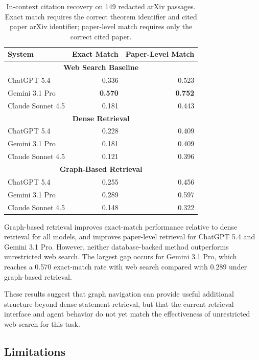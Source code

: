 \begin{table}[h]
\centering
\setlength{\tabcolsep}{4pt}
\small
\begin{tabular}{lrr}
\toprule
\textbf{System} & \textbf{Exact Match} & \textbf{Paper-Level Match} \\
\midrule
\multicolumn{3}{c}{\textbf{Web Search Baseline}} \\
ChatGPT 5.4       & 0.336 & 0.523 \\
Gemini 3.1 Pro    & \textbf{0.570} & \textbf{0.752} \\
Claude Sonnet 4.5 & 0.181 & 0.443 \\
\midrule
\multicolumn{3}{c}{\textbf{Dense Retrieval}} \\
ChatGPT 5.4       & 0.228 & 0.409 \\
Gemini 3.1 Pro    & 0.181 & 0.409 \\
Claude Sonnet 4.5 & 0.121 & 0.396 \\
\midrule
\multicolumn{3}{c}{\textbf{Graph-Based Retrieval}} \\
ChatGPT 5.4       & 0.255 & 0.456 \\
Gemini 3.1 Pro    & 0.289 & 0.597 \\
Claude Sonnet 4.5 & 0.148 & 0.322 \\
\bottomrule
\end{tabular}
\caption{
In-context citation recovery on 149 redacted arXiv passages. Exact match
requires the correct theorem identifier and cited paper arXiv identifier;
paper-level match requires only the correct cited paper.
}
\label{tab:literature-search}
\end{table}

Graph-based retrieval improves exact-match performance relative to dense
retrieval for all models, and improves paper-level
retrieval for ChatGPT 5.4 and Gemini 3.1 Pro. However, neither database-backed method outperforms unrestricted web search. The largest gap occurs for Gemini 3.1 Pro, which reaches a 0.570 exact-match rate with web search compared with 0.289 under graph-based retrieval.

These results suggest that graph navigation can provide useful additional structure beyond dense statement retrieval, but that the current retrieval interface and agent behavior do not yet match the effectiveness of unrestricted web search for this task.

\subsection{Limitations}


